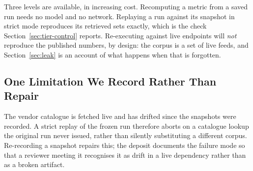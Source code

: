 \documentclass[acmsmall,review,anonymous,screen]{acmart}
\begin{document}
Three levels are available, in increasing cost. Recomputing a metric from a
saved run needs no model and no network. Replaying a run against its snapshot in
strict mode reproduces its retrieved sets exactly, which is the check
Section~\ref{sec:tier-control} reports. Re-executing against live endpoints will
\emph{not} reproduce the published numbers, by design: the corpus is a set of
live feeds, and Section~\ref{sec:leak} is an account of what happens when that
is forgotten.

\subsection{One Limitation We Record Rather Than Repair}

The vendor catalogue is fetched live and has drifted since the snapshots were
recorded. A strict replay of the frozen run therefore aborts on a catalogue
lookup the original run never issued, rather than silently substituting a
different corpus. Re-recording a snapshot repairs this; the deposit documents
the failure mode so that a reviewer meeting it recognises it as drift in a live
dependency rather than as a broken artifact.
\end{document}
